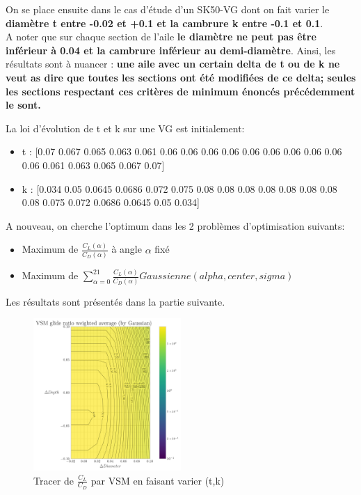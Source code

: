 \documentclass[conference]{IEEEtran}
\begin{document}
On se place ensuite dans le cas d'étude d'un SK50-VG dont on fait varier le \textbf{diamètre t entre -0.02 et +0.1 et la cambrure k entre -0.1 et 0.1}. \\
    A noter que sur chaque section de l'aile \textbf{le diamètre ne peut pas être inférieur à 0.04 et la cambrure inférieur au demi-diamètre}. Ainsi, les résultats sont à nuancer : \textbf{une aile avec un certain delta de t ou de k ne veut as dire que toutes les sections ont été modifiées de ce delta; seules les sections respectant ces critères de minimum énoncés précédemment le sont.}

La loi d'évolution de t et k sur une VG est initialement:  
\begin{itemize}
    \item t : [0.07 0.067 0.065 0.063 0.061 0.06 0.06  0.06 0.06 0.06  0.06  0.06 0.06 0.06  0.06 0.061 0.063 0.065 0.067 0.07]
    \item k : [0.034 0.05 0.0645 0.0686 0.072 0.075 0.08 0.08 0.08 0.08      0.08 0.08 0.08 0.08 0.075 0.072 0.0686 0.0645 0.05 0.034]
\end{itemize}

    A nouveau, on cherche l'optimum dans les 2 problèmes d'optimisation suivants:
    \begin{itemize}
        \item Maximum de $\frac{C_L(\alpha)}{C_D(\alpha)}$ à angle $\alpha$ fixé 
        \item Maximum de $\sum_{\alpha = 0}^{21}\frac{C_L(\alpha)}{C_D(\alpha)} Gaussienne(alpha, center, sigma) $
    \end{itemize}
    Les résultats sont présentés dans la partie suivante.

\begin{figure}[H]
    \centering
    \includegraphics[width=0.5\textwidth]{Pics/vsm.png}  
    \caption{Tracer de $\frac{C_L}{C_D}$ par VSM en faisant varier (t,k)}
    \label{fig:vsm}
\end{figure}
\end{document}
